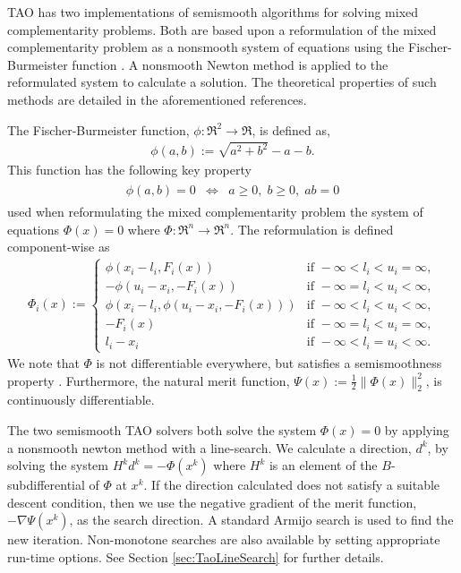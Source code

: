 TAO has two implementations of semismooth algorithms 
\cite{munson.facchinei.ea:semismooth, deluca.facchinei.ea:semismooth, 
facchinei.fischer.ea:semismooth} for solving mixed complementarity problems.
Both are based upon a reformulation of the mixed complementarity problem
as a nonsmooth system of equations using the Fischer-Burmeister 
function \cite{fischer:special}.  A nonsmooth Newton method is applied to
the reformulated system to calculate a solution.  The theoretical properties
of such methods are detailed in the aforementioned references.

The Fischer-Burmeister function, $\phi:\Re^2 \to \Re$, is defined as,
\begin{eqnarray*}
\phi(a,b) := \sqrt{a^2 + b^2} - a - b.
\end{eqnarray*}
This function has the following key property
\begin{eqnarray*}
\begin{array}{lcr}
        \phi(a,b) = 0 & \Leftrightarrow & a \geq 0,\; b \geq 0,\; ab = 0
\end{array}
\end{eqnarray*}
used when reformulating the mixed complementarity problem the system of 
equations $\Phi(x) = 0$ where $\Phi:\Re^n \to \Re^n$.  
The reformulation is defined component-wise as
\begin{eqnarray*}
\Phi_i(x) := \left\{ \begin{array}{ll}
   \phi(x_i - l_i, F_i(x)) & \mbox{if } -\infty < l_i < u_i = \infty, \\
   -\phi(u_i-x_i, -F_i(x)) & \mbox{if } -\infty = l_i < u_i < \infty, \\
   \phi(x_i - l_i, \phi(u_i - x_i, - F_i(x))) & \mbox{if } -\infty < l_i < u_i < \infty, \\
   -F_i(x) & \mbox{if } -\infty = l_i < u_i = \infty, \\
   l_i - x_i & \mbox{if } -\infty < l_i = u_i < \infty.
   \end{array} \right.
\end{eqnarray*}
We note that $\Phi$ is not differentiable everywhere, but satisfies a
semismoothness property 
\cite{mifflin:semismooth, qi:convergence, qi.sun:nonsmooth}.  Furthermore,
the natural merit function, $\Psi(x) := \frac{1}{2} \| \Phi(x) \|_2^2$, is 
continuously differentiable.

The two semismooth TAO solvers both solve the system $\Phi(x) = 0$ by applying
a nonsmooth newton method with a line-search.  We calculate a direction, $d^k$,
by solving the system $H^kd^k = -\Phi(x^k)$ where $H^k$ is an element of the 
$B$-subdifferential \cite{qi.sun:nonsmooth} of $\Phi$ at $x^k$.  If the 
direction calculated does not satisfy a suitable descent condition, then 
we use the negative gradient of the merit function, $-\nabla \Psi(x^k)$, as 
the search direction.  A standard Armijo search \cite{armijo:minimization} is
used to find the new iteration.  Non-monotone searches 
\cite{grippo.lampariello.ea:nonmonotone} are also available by setting 
appropriate run-time options.  See Section \ref{sec:TaoLineSearch} for further 
details.

